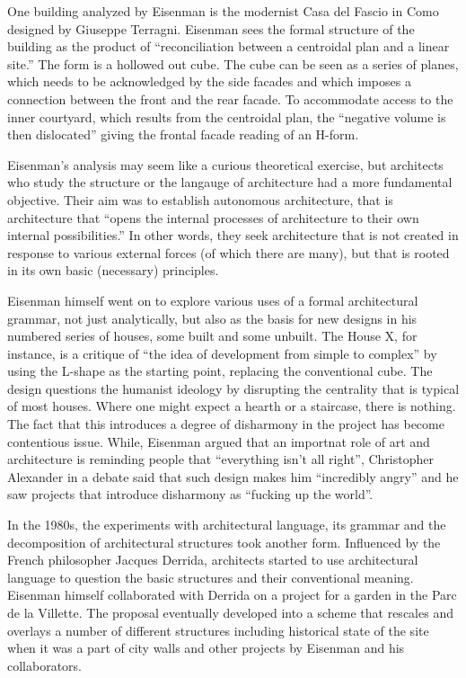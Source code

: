 One building analyzed by Eisenman is the modernist Casa del Fascio in Como designed by
Giuseppe Terragni. Eisenman sees the formal structure of the building as the product of
``reconciliation between a centroidal plan and a linear site.''
The form is a hollowed out cube. The cube can be seen as a series of planes, which needs
to be acknowledged by the side facades and which imposes a connection between the front and
the rear facade. To accommodate access to the inner courtyard, which results from the centroidal
plan, the ``negative volume is then dislocated'' giving the frontal facade reading of
an H-form.

Eisenman's analysis may seem like a curious theoretical exercise, but architects who study
the structure or the langauge of architecture had a more fundamental objective. Their aim
was to establish autonomous architecture, that is architecture that ``opens the internal
processes of architecture to their own internal possibilities.'' In other words, they seek architecture that is not created in response
to various external forces (of which there are many), but that is rooted in its own basic
(necessary) principles.

Eisenman himself went on to explore various uses of a formal architectural
grammar, not just analytically, but also as the basis for new designs in his numbered series of
houses, some built and some unbuilt. The House X, for instance, is a critique of ``the idea of
development from simple to complex'' by using the L-shape as the
starting point, replacing the conventional cube. The design questions the humanist ideology
by disrupting the centrality that is typical of most houses. Where one might expect a hearth or
a staircase, there is nothing. The fact that this introduces a degree of disharmony in the project
has become contentious issue. While, Eisenman argued that an importnat role of art and architecture
is reminding people that ``everything isn't all right'', Christopher Alexander in a debate said
that such design makes him ``incredibly angry'' and he saw projects that introduce disharmony
as ``fucking up the world''.

In the 1980s, the experiments with architectural language, its grammar and the decomposition
of architectural structures took another form. Influenced by the French philosopher Jacques
Derrida, architects started to use architectural language to question the basic structures
and their conventional meaning. Eisenman himself collaborated with Derrida on a
project for a garden in the Parc de la Villette. The proposal eventually developed into a scheme that rescales and overlays a number of different structures including
historical state of the site when it was a part of city walls and other projects by Eisenman
and his collaborators.

